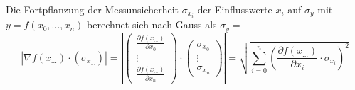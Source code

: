 Die Fortpflanzung der Messunsicherheit $\sigma_{x_i}$ der Einflusswerte $x_i$ auf $\sigma_y$ mit $y = f(x_0, ..., x_n)$ berechnet sich nach {\sc Gauss} als $\sigma_y = $
$$ |\nabla f(x_{...}) \cdot (\sigma_{x_{...}})| =
\left|
	\begin{pmatrix} \frac{\partial f(x_{...})}{\partial x_0} \\ \vdots \\ \frac{\partial f(x_{...})}{\partial x_n} \end{pmatrix} \cdot
	\begin{pmatrix} \sigma_{x_0} \\ \vdots \\ \sigma_{x_n} \end{pmatrix}
\right| = \sqrt{\sum_{i=0}^n {\left(\frac{\partial f(x_{...})}{\partial x_i} \cdot \sigma_{x_i}\right)}^2} $$

